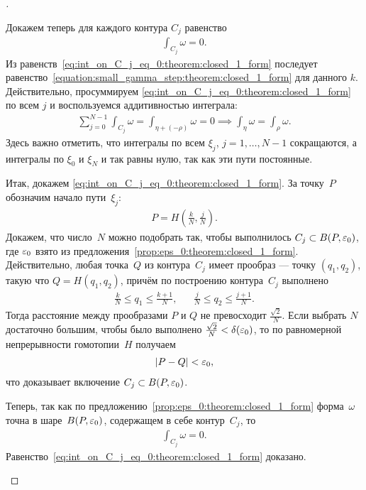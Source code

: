 \documentclass[../complex-analysis.tex]{subfiles}
\begin{document}
\begin{proof}[]
\begin{itemize}
   Докажем теперь для каждого контура $C_j$ равенство
   \begin{align}
    \label{eq:int_on_C_j_eq_0:theorem:closed_1_form}
    \int_{C_j} \omega = 0. 
   \end{align} Из равенств~\eqref{eq:int_on_C_j_eq_0:theorem:closed_1_form} последует равенство~\eqref{equation:small_gamma_step:theorem:closed_1_form} для данного $ k $. Действительно, просуммируем \eqref{eq:int_on_C_j_eq_0:theorem:closed_1_form} по всем $ j $ и воспользуемся аддитивностью интеграла:
   \begin{align*}
    \sum_{j=0}^{N-1} \int_{C_j} \omega = \int_{\eta + (-\rho)} \omega = 0 \implies \int_{\eta} \omega = \int_{\rho} \omega.  
   \end{align*} Здесь важно отметить, что интегралы по всем $ \xi_j $, $ j=1,\ldots,N-1 $ сокращаются, а интегралы по $ \xi_0 $ и $ \xi_N $ и так равны нулю, так как эти пути постоянные.

   Итак, докажем \eqref{eq:int_on_C_j_eq_0:theorem:closed_1_form}. За точку~$P$ обозначим начало пути~$\xi_j$:
   \begin{align*}
    P = H \left( \frac{k}{N}, \frac{j}{N} \right).
   \end{align*}Докажем, что число~$ N $ можно подобрать так, чтобы выполнилось $ C_j \subset B(P,\varepsilon_0) $, где $ \varepsilon_0 $ взято из предложения~\ref{prop:eps_0:theorem:closed_1_form}. Действительно, любая точка~$ Q $ из контура~$ C_j $ имеет прообраз --- точку $ (q_1, q_2) $, такую что  $ Q = H(q_1, q_2) $, причём по построению контура~$ C_j $ выполнено
   \begin{align*}
    \frac{k}{N} \leqslant q_1 \leqslant \frac{k+1}{N}, && \frac{j}{N} \leqslant q_2 \leqslant \frac{j+1}{N}.
   \end{align*} Тогда расстояние между прообразами $ P $ и $ Q $ не превосходит $ \frac{\sqrt 2}{N} $. Если выбрать $ N $ достаточно большим, чтобы было выполнено $ \frac{\sqrt 2}{N} < \delta(\varepsilon_0) $, то по равномерной непрерывности гомотопии~$ H $ получаем
   \begin{align*}
    \left| P - Q \right| < \varepsilon_0,
   \end{align*} что доказывает включение $C_j \subset B(P,\varepsilon_0)$.

   Теперь, так как по предложению~\ref{prop:eps_0:theorem:closed_1_form} форма~$\omega$ точна в шаре~$B(P,\varepsilon_0)$, содержащем в себе контур~$ C_j $, то
   \begin{align*}
    \int_{C_j} \omega = 0.
   \end{align*} Равенство~\eqref{eq:int_on_C_j_eq_0:theorem:closed_1_form} доказано.


\end{itemize}
\end{proof}
\end{document}

